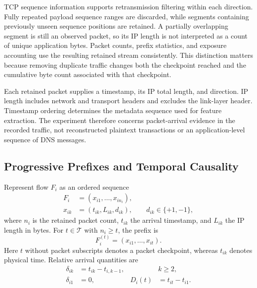 \documentclass[conference]{IEEEtran}
\begin{document}
TCP sequence information supports retransmission filtering within each direction. Fully repeated payload sequence ranges are discarded, while segments containing previously unseen sequence positions are retained. A partially overlapping segment is still an observed packet, so its IP length is not interpreted as a count of unique application bytes. Packet counts, prefix statistics, and exposure accounting use the resulting retained stream consistently. This distinction matters because removing duplicate traffic changes both the checkpoint reached and the cumulative byte count associated with that checkpoint.

Each retained packet supplies a timestamp, its IP total length, and direction. IP length includes network and transport headers and excludes the link-layer header. Timestamp ordering determines the metadata sequence used for feature extraction. The experiment therefore concerns packet-arrival evidence in the recorded traffic, not reconstructed plaintext transactions or an application-level sequence of DNS messages.

\subsection{Progressive Prefixes and Temporal Causality}
Represent flow $F_i$ as an ordered sequence
\begin{equation}
\begin{aligned}
F_i&=(x_{i1},\ldots,x_{in_i}),\\
x_{ik}&=(t_{ik},L_{ik},d_{ik}),
\qquad d_{ik}\in\{+1,-1\},
\end{aligned}
\label{eq:flow_sequence}
\end{equation}
where $n_i$ is the retained packet count, $t_{ik}$ the arrival timestamp, and $L_{ik}$ the IP length in bytes. For $t\in\mathcal{T}$ with $n_i\ge t$, the prefix is
\begin{equation}
F_i^{(t)}=(x_{i1},\ldots,x_{it}).
\label{eq:prefix}
\end{equation}
Here $t$ without packet subscripts denotes a packet checkpoint, whereas $t_{ik}$ denotes physical time. Relative arrival quantities are
\begin{equation}
\begin{aligned}
\delta_{ik}&=t_{ik}-t_{i,k-1}, && k\ge2,\\
\delta_{i1}&=0, &
D_i(t)&=t_{it}-t_{i1}.
\end{aligned}
\label{eq:arrival_quantities}
\end{equation}
\end{document}
